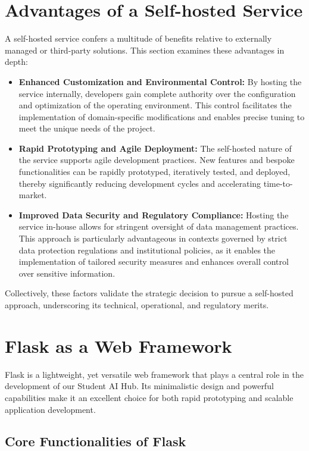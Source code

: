 \section{Advantages of a Self-hosted Service}
A self-hosted service confers a multitude of benefits relative to externally managed or third-party solutions. This section examines these advantages in depth:
\begin{itemize}
    \item \textbf{Enhanced Customization and Environmental Control:} By hosting the service internally, developers gain complete authority over the configuration and optimization of the operating environment. This control facilitates the implementation of domain-specific modifications and enables precise tuning to meet the unique needs of the project.
    \item \textbf{Rapid Prototyping and Agile Deployment:} The self-hosted nature of the service supports agile development practices. New features and bespoke functionalities can be rapidly prototyped, iteratively tested, and deployed, thereby significantly reducing development cycles and accelerating time-to-market.
    \item \textbf{Improved Data Security and Regulatory Compliance:} Hosting the service in-house allows for stringent oversight of data management practices. This approach is particularly advantageous in contexts governed by strict data protection regulations and institutional policies, as it enables the implementation of tailored security measures and enhances overall control over sensitive information.
\end{itemize}
Collectively, these factors validate the strategic decision to pursue a self-hosted approach, underscoring its technical, operational, and regulatory merits.

\section{Flask as a Web Framework}

Flask is a lightweight, yet versatile web framework that plays a central role in the development of our Student AI Hub. Its minimalistic design and powerful capabilities make it an excellent choice for both rapid prototyping and scalable application development.

\subsection{Core Functionalities of Flask}

